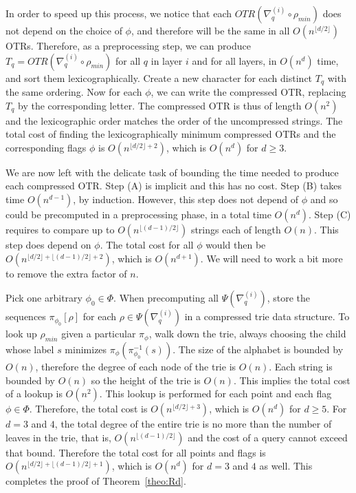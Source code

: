 \documentclass[leqno,12pt]{article}
\begin{document}
In order to speed up this process, we notice that each
$OTR(\nabla^{(i)}_q\circ\rho_{min})$ does not depend on the choice of
$\phi$, and therefore will be the same in all 
$O(n^{\lfloor d/2\rfloor})$ OTRs. Therefore, as a preprocessing step,
we can produce $T_q =OTR(\nabla^{(i)}_q\circ\rho_{min})$ 
for all $q$ in layer $i$ and for all layers, in $O(n^d)$ time, and sort them lexicographically. 
Create a new character for each distinct $T_q$ with the same
ordering. Now for each $\phi$, we can write the compressed OTR,
replacing $T_q$ by the corresponding letter. The compressed OTR is
thus of length $O(n^2)$ and the lexicographic order matches the
order of the uncompressed strings. 
The total cost of finding the lexicographically minimum compressed
OTRs and the corresponding flags $\phi$ is 
$O(n^{\lfloor d/2 \rfloor + 2})$, which is $O(n^d)$ for $d\geq 3$.

We are now left with the delicate task of bounding the time needed to
produce each compressed OTR. Step (A) is implicit and this has no
cost. Step (B) takes time $O(n^{d-1})$, by induction. However, this
step does not depend of $\phi$ and so could be precomputed in a
preprocessing phase, in a total time $O(n^d)$.
Step (C) requires to compare up to $O(n^{\lfloor (d-1)/2\rfloor})$ strings
each of length $O(n)$. This step does depend on $\phi$. 
The total cost for all $\phi$ would then be 
$O(n^{\lfloor d/2\rfloor + \lfloor (d-1)/2\rfloor +2})$, which is
$O(n^{d+1})$.
We will need to work a bit more to remove the extra factor of  $n$.

Pick one arbitrary $\phi_0\in\Phi$. 
When precomputing all $\Psi(\nabla^{(i)}_q)$, store the sequences
$\pi_{\phi_0}[\rho]$ for each $\rho\in \Psi(\nabla^{(i)}_q)$ in a
compressed trie data structure. To look up $\rho_{min}$ given a
particular $\pi_\phi$, walk down the trie, always choosing the
child whose label $s$ minimizes $\pi_\phi(\pi_{\phi_0}^{-1}(s))$.
The size of the alphabet is bounded by $O(n)$, therefore the degree of each node of the trie is $O(n)$. Each string is bounded by $O(n)$ so the height of the trie is $O(n)$. This implies the total cost of a lookup is $O(n^2)$.
This lookup is performed for each point and each
flag $\phi\in\Phi$. Therefore, the total cost is 
$O(n^{\lfloor d/2\rfloor + 3})$, which is $O(n^d)$ for $d{\geq}5$.
For $d=3$ and $4$,
the total degree of the
entire trie is no more than the number of leaves in the trie, that is, 
$O(n^{\lfloor (d-1)/2\rfloor})$ and the cost of a query cannot exceed
that bound. Therefore the total cost for all points and flags is 
$O(n^{\lfloor d/2\rfloor + \lfloor (d-1)/2\rfloor +1})$, which is
$O(n^{d})$ for $d=3$ and $4$ as well. This completes the proof of Theorem~\ref{theo:Rd}.
\end{document}
